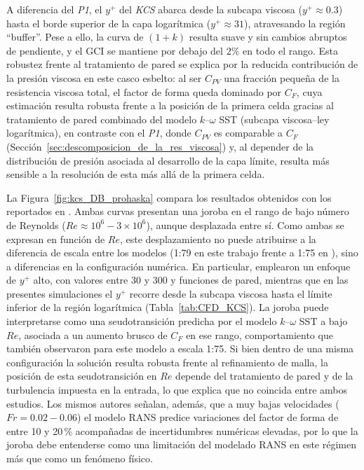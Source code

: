 A diferencia del \textit{P1}, el $y^+$ del \textit{KCS} abarca desde la subcapa viscosa 
($y^+ \approx 0{.}3$) hasta el borde superior de la capa logarítmica 
($y^+ \approx 31$), atravesando la región ``buffer''. Pese a ello, la 
curva de $(1+k)$ resulta suave y sin cambios abruptos de pendiente, y el GCI se 
mantiene por debajo del $2\%$ en todo el rango. Esta robustez frente al 
tratamiento de pared se explica por la reducida contribución de la presión 
viscosa en este casco esbelto: al ser $C_{PV}$ una fracción pequeña de la 
resistencia viscosa total, el factor de forma queda dominado por $C_F$, cuya estimación resulta robusta 
frente a la posición de la primera celda gracias al tratamiento de pared 
combinado del modelo $k$--$\omega$ SST (subcapa viscosa--ley logarítmica), 
en contraste con el \textit{P1}, donde $C_{PV}$ es comparable a $C_F$ 
(Sección~\ref{sec:descomposicion_de_la_res_viscosa}) y, al depender de la 
distribución de presión asociada al desarrollo de la capa límite, resulta 
más sensible a la resolución de esta más allá de la primera celda.

La Figura~\ref{fig:kcs_DB_prohaska} compara los resultados obtenidos con los 
reportados en \citet{TERZIEV2021147}. Ambas curvas presentan una joroba en el rango de bajo número de Reynolds 
($Re \approx 10^6 - 3\times10^6$), aunque desplazada entre sí. Como ambas se 
expresan en función de $Re$, este desplazamiento no puede atribuirse a la 
diferencia de escala entre los modelos (1:79 en este trabajo frente a 1:75 en 
\citet{TERZIEV2021147}), sino a diferencias en la configuración numérica. En 
particular, \citet{TERZIEV2021147} emplearon un enfoque de $y^+$ alto, con 
valores entre 30 y 300 y funciones de pared, mientras que en las presentes 
simulaciones el $y^+$ recorre desde la subcapa viscosa hasta el límite 
inferior de la región logarítmica (Tabla~\ref{tab:CFD_KCS}). La joroba puede 
interpretarse como una seudotransición predicha por el modelo $k$--$\omega$ 
SST a bajo $Re$, asociada a un aumento brusco de $C_F$ en ese rango, 
comportamiento que \citet{TERZIEV2021147} también observaron para este modelo 
a escala 1:75. Si bien dentro de una misma configuración la solución resulta 
robusta frente al refinamiento de malla, la posición de esta seudotransición 
en $Re$ depende del tratamiento de pared y de la turbulencia impuesta en la 
entrada, lo que explica que no coincida entre ambos estudios. Los mismos 
autores señalan, además, que a muy bajas velocidades ($Fr = 0{.}02 - 0{.}06$) 
el modelo RANS predice variaciones del factor de forma de entre 10 y 
20\,\% acompañadas de incertidumbres numéricas elevadas, por lo que la 
joroba debe entenderse como una limitación del modelado RANS en este régimen 
más que como un fenómeno físico.

